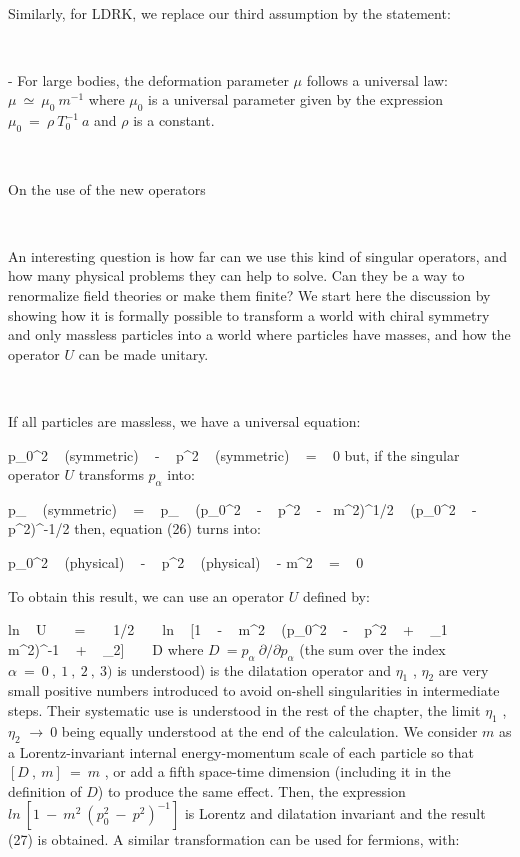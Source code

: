 \documentclass[a4paper,12pt,dvips]{article}
\makeatletter
\renewcommand{\section}{\@startsection{section}{1}{0in}
	{0.4\baselineskip}{0.1\baselineskip}{\Large\bf}}
\makeatother
\begin{document}
~ 

Similarly, for LDRK, we replace our third assumption by the statement:

~ 

- For large bodies, the deformation parameter $\mu $ follows a universal law: $\mu ~ \simeq ~ \mu _0 ~ m^{-1}$ where $ \mu _0 $ is a universal parameter given by the expression $\mu _0 ~ = ~ \rho ~ T_0^{-1} ~ a$ and $\rho $ is a constant.

~
~

\section{On the use of the new operators}
\label{renor.sec}
\vspace{0.5ex}

~

An interesting question is how far can we use this kind of singular operators, and how many physical problems they can help to solve. Can they be a way to renormalize field theories or make them finite? We start here the discussion by showing how it is formally possible to transform a world with chiral symmetry and only massless particles into a world where particles have masses, and how the operator $U$ can be made unitary. 

~ 

If all particles are massless, we have a universal equation:

\equation
p_0^2 ~ (symmetric) ~ - ~ p^2 ~ (symmetric) ~ = ~ 0
\endequation
\noindent
but, if the singular operator $U$ transforms $p_{\alpha }$ into: 

\equation
p_{\alpha } ~ (symmetric) ~ = ~ p_{\alpha } ~ (p_0^2 ~ - ~ p^2 ~ -~ m^2)^{1/2} ~ (p_0^2 ~ - ~ p^2)^{-1/2}
\endequation
\noindent
then, equation (26) turns into:

\equation
p_0^2 ~ (physical) ~ - ~ p^2 ~ (physical) ~ - m^2 ~ = ~ 0
\endequation
\noindent

To obtain this result, we can use an operator $U$ defined by:

\equation
ln ~ U ~ ~ = ~ ~ 1/2 ~ ~ ln ~ [1 ~ - ~ m^2 ~ (p_0^2 ~ - ~ p^2 ~ + ~ \eta _1 ~ m^2)^{-1} ~ + ~ \eta _2] ~ ~ D
\endequation
\noindent
where $D ~ = p_ {\alpha } ~ \partial/\partial p_ {\alpha }$ (the sum over the index ${\alpha }~ =~ 0~ , ~ 1~ , ~ 2~ , ~ 3)$ is understood) is the dilatation operator and $\eta _1$ , $\eta _2$ are very small positive numbers introduced to avoid on-shell singularities in intermediate steps. Their systematic use is understood in the rest of the chapter, the limit $\eta _1$ , $\eta _2$ $\rightarrow ~ 0$ being equally understood at the end of the calculation. We consider $m$ as a Lorentz-invariant internal energy-momentum scale of each particle so that $[D ~ , ~ m] ~ = ~ m$ , or add a fifth space-time dimension (including it in the definition of $D$) to produce the same effect. Then, the expression $ ln ~ [1 ~ - ~ m^2 ~ (p_0^2 ~ - ~ p^2)^{-1}]$ is Lorentz and dilatation invariant and the result (27) is obtained. A similar transformation can be used for fermions, with:
\end{document}

